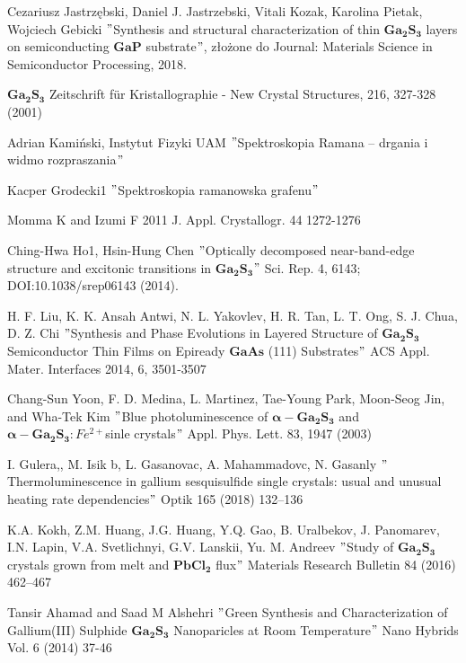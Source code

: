 \newpage
 
\begin{thebibliography}{}
	 Cezariusz Jastrzębski, Daniel J. Jastrzebski, Vitali Kozak, Karolina Pietak, Wojciech Gebicki $"$Synthesis and structural characterization of thin $\mathbf{Ga_{2}S_{3}}$ layers on semiconducting $\mathbf{GaP}$ substrate$"$, złożone do Journal: Materials Science in Semiconductor Processing, 2018.
	
	 $\mathbf{Ga_{2}S_{3}}$ Zeitschrift für Kristallographie - New Crystal Structures, 216, 327-328 (2001)
	
	 Adrian Kamiński, Instytut Fizyki UAM $"$Spektroskopia Ramana – drgania i widmo rozpraszania$"$
	
	 Kacper Grodecki1 $"$Spektroskopia ramanowska grafenu$"$
	
	 Momma K and Izumi F 2011 J. Appl. Crystallogr. 44 1272-1276
	
	 Ching-Hwa Ho1, Hsin-Hung Chen $"$Optically decomposed near-band-edge structure and excitonic transitions in
	$\mathbf{Ga_{2}S_{3}}$$"$ Sci. Rep. 4, 6143; DOI:10.1038/srep06143
	(2014).
	
	 H. F. Liu, K. K. Ansah Antwi, N. L. Yakovlev, H. R. Tan, L. T. Ong, S. J. Chua, D. Z. Chi $"$Synthesis and Phase Evolutions in Layered Structure of $\mathbf{Ga_{2}S_{3}}$ Semiconductor Thin Films on Epiready $\mathbf{GaAs}$ (111) Substrates$"$ ACS Appl. Mater. Interfaces 2014, 6, 3501-3507
	
	 Chang-Sun Yoon, F. D. Medina, L. Martinez, Tae-Young Park, Moon-Seog Jin, and Wha-Tek Kim $"$Blue photoluminescence of $\mathbf{\alpha-Ga_{2}S_{3}}$ and $\mathbf{\alpha-Ga_{2}S_{3}}:Fe^{2+} $sinle crystals$"$ Appl. Phys. Lett. 83, 1947 (2003)
	
	 I. Gulera,, M. Isik b, L. Gasanovac, A. Mahammadovc, N. Gasanly $"$Thermoluminescence in gallium sesquisulfide single crystals:
	usual and unusual heating rate dependencies$"$ Optik 165 (2018) 132–136
	
	 K.A. Kokh, Z.M. Huang, J.G. Huang, Y.Q. Gao, B. Uralbekov, J. Panomarev, I.N. Lapin, V.A. Svetlichnyi, G.V. Lanskii, Yu. M. Andreev $"$Study of $\mathbf{Ga_{2}S_{3}}$ crystals grown from melt and $\mathbf{PbCl_{2}}$ flux$"$ Materials Research Bulletin 84 (2016) 462–467
	
	 Tansir Ahamad and Saad M Alshehri $"$Green Synthesis and Characterization of Gallium(III) Sulphide $\mathbf{Ga_{2}S_{3}}$
	Nanoparicles at Room Temperature$"$ Nano Hybrids Vol. 6 (2014) 37-46
	

\end{thebibliography}
